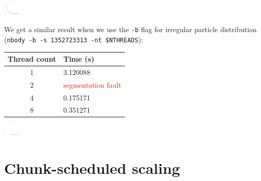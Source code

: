\documentclass{article}[12pt;letterpaper]
\begin{document}
\includegraphics[width=0.3in]{a2_sec1_1.png}

We get a similar result when we use the \texttt{-b} flag for irregular
particle distribution (\texttt{nbody -b -s 1352723313 -nt \$NTHREADS}):

\begin{tabular}{c l}
Thread count & Time (s) \\
\hline{}
1 & 3.120088 \\
2 & \textcolor{red}{segmentation fault} \\ %
4 & 0.175171 \\
8 & 0.351271
\end{tabular}

\includegraphics[width=0.3in]{a2_sec1_2.png}

\section{Chunk-scheduled scaling}
\end{document}

